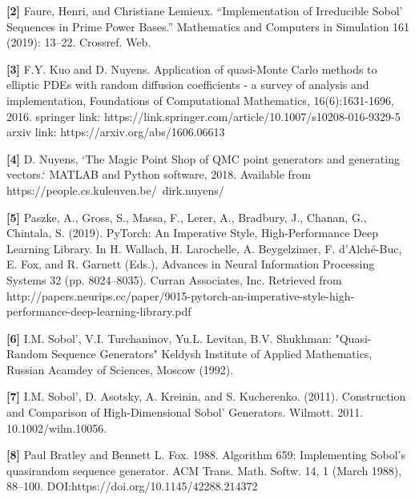 \noindent \textbf{[2]} Faure, Henri, and Christiane Lemieux. “Implementation of Irreducible Sobol' Sequences in Prime Power Bases.” Mathematics and Computers in Simulation 161 (2019): 13–22. Crossref. Web.

\noindent \textbf{[3]} F.Y. Kuo and D. Nuyens. Application of quasi-Monte Carlo methods to elliptic PDEs with random diffusion coefficients
- a survey of analysis and implementation, Foundations of Computational Mathematics, 16(6):1631-1696, 2016. springer link: https://link.springer.com/article/10.1007/s10208-016-9329-5 arxiv link: https://arxiv.org/abs/1606.06613

\noindent \textbf{[4]} D. Nuyens, `The Magic Point Shop of QMC point generators and generating vectors.` MATLAB and Python software, 2018. Available from
https://people.cs.kuleuven.be/~dirk.nuyens/

\noindent \textbf{[5]} Paszke, A., Gross, S., Massa, F., Lerer, A., Bradbury, J., Chanan, G., Chintala, S. (2019). PyTorch: An Imperative Style, High-Performance Deep Learning Library. In H. Wallach, H. Larochelle, A. Beygelzimer, F. d'Alché-Buc, E. Fox, and R. Garnett (Eds.), Advances in Neural Information Processing Systems 32 (pp. 8024–8035). Curran Associates, Inc. Retrieved from http://papers.neurips.cc/paper/9015-pytorch-an-imperative-style-high-performance-deep-learning-library.pdf

\noindent \textbf{[6]} I.M. Sobol', V.I. Turchaninov, Yu.L. Levitan, B.V. Shukhman: "Quasi-Random Sequence Generators" Keldysh Institute of Applied Mathematics,
Russian Acamdey of Sciences, Moscow (1992).

\noindent \textbf{[7]} I.M. Sobol', D. Asotsky,  A. Kreinin,  and S. Kucherenko. (2011). Construction and Comparison of High-Dimensional Sobol' Generators. Wilmott. 2011. 10.1002/wilm.10056.

\noindent \textbf{[8]} Paul Bratley and Bennett L. Fox. 1988. Algorithm 659: Implementing Sobol's quasirandom sequence generator.
ACM Trans. Math. Softw. 14, 1 (March 1988), 88–100. DOI:https://doi.org/10.1145/42288.214372